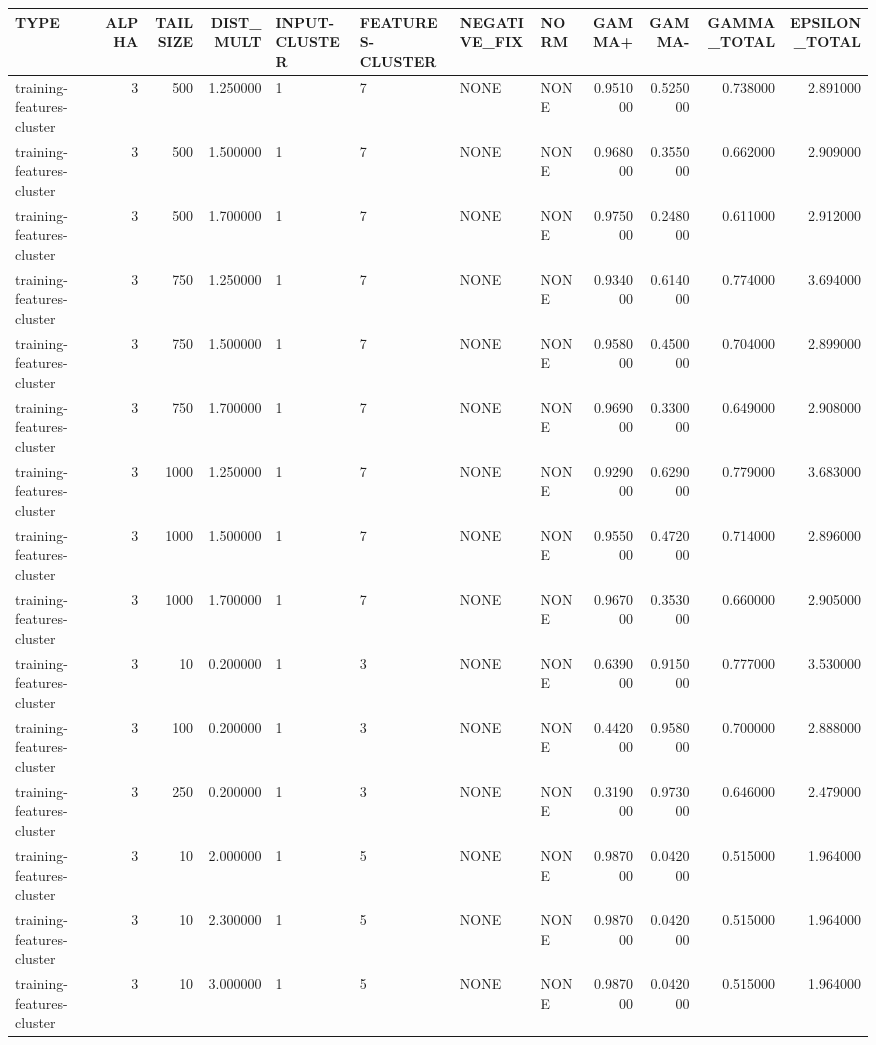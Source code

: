\begin{tabular}{lrrrllllrrrr}
\toprule
TYPE & ALPHA & TAILSIZE & DIST_MULT & INPUT-CLUSTER & FEATURES-CLUSTER & NEGATIVE_FIX & NORM & GAMMA+ & GAMMA- & GAMMA_TOTAL & EPSILON_TOTAL \\
\midrule
training-features-cluster & 3 & 500 & 1.250000 & 1 & 7 & NONE & NONE & 0.951000 & 0.525000 & 0.738000 & 2.891000 \\
training-features-cluster & 3 & 500 & 1.500000 & 1 & 7 & NONE & NONE & 0.968000 & 0.355000 & 0.662000 & 2.909000 \\
training-features-cluster & 3 & 500 & 1.700000 & 1 & 7 & NONE & NONE & 0.975000 & 0.248000 & 0.611000 & 2.912000 \\
training-features-cluster & 3 & 750 & 1.250000 & 1 & 7 & NONE & NONE & 0.934000 & 0.614000 & 0.774000 & 3.694000 \\
training-features-cluster & 3 & 750 & 1.500000 & 1 & 7 & NONE & NONE & 0.958000 & 0.450000 & 0.704000 & 2.899000 \\
training-features-cluster & 3 & 750 & 1.700000 & 1 & 7 & NONE & NONE & 0.969000 & 0.330000 & 0.649000 & 2.908000 \\
training-features-cluster & 3 & 1000 & 1.250000 & 1 & 7 & NONE & NONE & 0.929000 & 0.629000 & 0.779000 & 3.683000 \\
training-features-cluster & 3 & 1000 & 1.500000 & 1 & 7 & NONE & NONE & 0.955000 & 0.472000 & 0.714000 & 2.896000 \\
training-features-cluster & 3 & 1000 & 1.700000 & 1 & 7 & NONE & NONE & 0.967000 & 0.353000 & 0.660000 & 2.905000 \\
training-features-cluster & 3 & 10 & 0.200000 & 1 & 3 & NONE & NONE & 0.639000 & 0.915000 & 0.777000 & 3.530000 \\
training-features-cluster & 3 & 100 & 0.200000 & 1 & 3 & NONE & NONE & 0.442000 & 0.958000 & 0.700000 & 2.888000 \\
training-features-cluster & 3 & 250 & 0.200000 & 1 & 3 & NONE & NONE & 0.319000 & 0.973000 & 0.646000 & 2.479000 \\
training-features-cluster & 3 & 10 & 2.000000 & 1 & 5 & NONE & NONE & 0.987000 & 0.042000 & 0.515000 & 1.964000 \\
training-features-cluster & 3 & 10 & 2.300000 & 1 & 5 & NONE & NONE & 0.987000 & 0.042000 & 0.515000 & 1.964000 \\
training-features-cluster & 3 & 10 & 3.000000 & 1 & 5 & NONE & NONE & 0.987000 & 0.042000 & 0.515000 & 1.964000 \\

\end{tabular}
